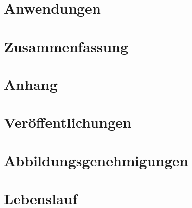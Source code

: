 \documentclass[
  paper=A4, 		%
  pagesize, 		%
  DIV=12, 		%
  ngerman,  		%
  12pt, 			%
  listof=totoc, 
  bibliography=totoc, 
  index=totoc, 
  openany, 
]{scrbook}
\begin{document}
\chapter{Anwendungen}\label{anwendungen}


\chapter{Zusammenfassung}\label{zusammenfassung}


\chapter{Anhang}\label{anhang}


\backmatter

\begingroup
	\renewcommand*{\addvspace}[1]{}
	\listoffigures
\endgroup

\begingroup
	\renewcommand*{\addvspace}[1]{}
	\listoftables
\endgroup
\newpage


\printbibliography[title=Literaturverzeichnis]

\chapter*{Veröffentlichungen}


\chapter*{Abbildungsgenehmigungen}


\chapter*{Lebenslauf}

\newpage
\thispagestyle{empty}
\quad

\newpage
\thispagestyle{empty}
\quad

\printglossary[type=\acronymtype,style=long]
\appendix
%
\end{document}
